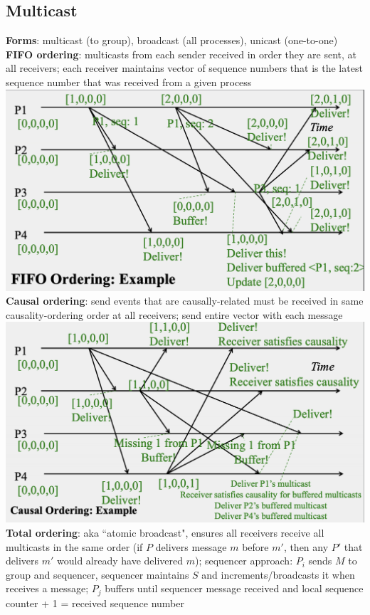 \documentclass{article}
\begin{document}
\begin{multicols*}{3}
\section{Multicast}
\textbf{Forms}: multicast (to group), broadcast (all processes), unicast (one-to-one) \\
\textbf{FIFO ordering}: multicasts from each sender received in order they are sent, at all receivers; each receiver maintains vector of sequence numbers that is the latest sequence number that was received from a given process \\
\includegraphics[width=\columnwidth]{fifo.png}
\textbf{Causal ordering}: send events that are causally-related must be received in same causality-ordering order at all receivers; send entire vector with each message
\includegraphics[width=\columnwidth]{causal.png}
\textbf{Total ordering}: aka ``atomic broadcast", ensures all receivers receive all multicasts in the same order (if $P$ delivers message $m$ before $m\prime$, then any $P\prime$ that delivers $m\prime$ would already have delivered $m$); sequencer approach: $P_i$ sends $M$ to group and sequencer, sequencer maintains $S$ and increments/broadcasts it when receives a message; $P_j$ buffers until sequencer message received and local sequence counter + 1 = received sequence number \\

\end{multicols*}
\end{document}
